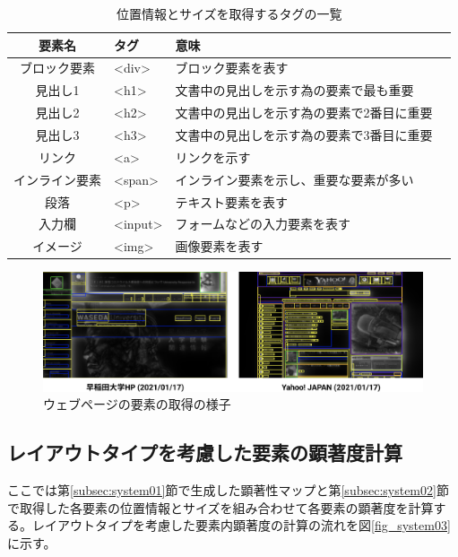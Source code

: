 \begin{table}[h]
    \caption{位置情報とサイズを取得するタグの一覧}
    \label{table:gettaglist}
    \centering
     \begin{tabular}{clll}
      \hline
      要素名 & タグ & 意味 \\
      \hline \hline
      ブロック要素 & \textless div\textgreater & ブロック要素を表す \\
      見出し1 & \textless h1\textgreater & 文書中の見出しを示す為の要素で最も重要 \\
      見出し2 & \textless h2\textgreater & 文書中の見出しを示す為の要素で2番目に重要 \\
      見出し3 & \textless h3\textgreater & 文書中の見出しを示す為の要素で3番目に重要 \\
      リンク & \textless a\textgreater & リンクを示す \\
      インライン要素 & \textless span\textgreater & インライン要素を示し、重要な要素が多い \\
      段落 & \textless p\textgreater & テキスト要素を表す \\
      入力欄 & \textless input\textgreater & フォームなどの入力要素を表す \\
      イメージ & \textless img\textgreater & 画像要素を表す \\
      \hline
    \end{tabular}
\end{table}

\begin{figure}[H]
  \centering
  \includegraphics[width=12cm]{figures/06_ex-lineview.jpg}
  \caption{ウェブページの要素の取得の様子}
  \label{fig_06_ex-lineview}
\end{figure}

\subsection{レイアウトタイプを考慮した要素の顕著度計算}\label{subsec:system03}
\par ここでは第\ref{subsec:system01}節で生成した顕著性マップと第\ref{subsec:system02}節で取得した各要素の位置情報とサイズを組み合わせて各要素の顕著度を計算する。レイアウトタイプを考慮した要素内顕著度の計算の流れを図\ref{fig_system03}に示す。

